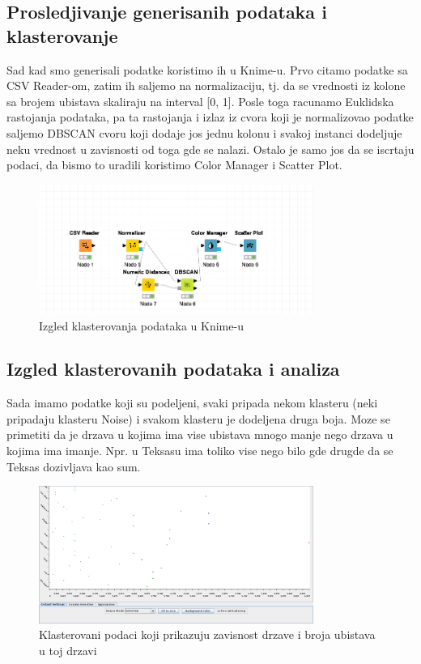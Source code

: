 \documentclass[11pt]{article} %
\begin{document}
	\subsection{Prosledjivanje generisanih podataka i klasterovanje}
	Sad kad smo generisali podatke koristimo ih u Knime-u.
	Prvo citamo podatke sa CSV Reader-om, zatim ih saljemo na normalizaciju, tj. da se vrednosti iz kolone sa brojem ubistava skaliraju na interval [0, 1].
	Posle toga racunamo Euklidska rastojanja podataka, pa ta rastojanja i izlaz iz cvora koji je normalizovao podatke saljemo DBSCAN cvoru koji 
	dodaje jos jednu kolonu i svakoj instanci dodeljuje neku vrednost u zavisnosti od toga gde se nalazi.
	Ostalo je samo jos da se iscrtaju podaci, da bismo to uradili koristimo Color Manager i Scatter Plot.
	\newline
	
	\begin{figure}[h!]
	\centering
		\includegraphics[width=0.8\textwidth]{klasterovanjeKnime}
		\caption{Izgled klasterovanja podataka u Knime-u}
	\end{figure}
	
	
	\newpage
	\subsection{Izgled klasterovanih podataka i analiza}
	Sada imamo podatke koji su podeljeni, svaki pripada nekom klasteru (neki pripadaju klasteru Noise) i svakom klasteru je dodeljena druga boja. Moze se 
	primetiti da je drzava u kojima ima vise ubistava mnogo manje nego drzava u kojima ima imanje. Npr. u Teksasu ima toliko vise nego bilo gde drugde da se 
	Teksas dozivljava kao sum.
	
	\begin{figure}[h!]
	\centering
		\includegraphics[width=0.8\textwidth]{klasterovanje1}
		\caption{Klasterovani podaci koji prikazuju zavisnost drzave i broja ubistava u toj drzavi}
	\end{figure}
	
\end{document}
